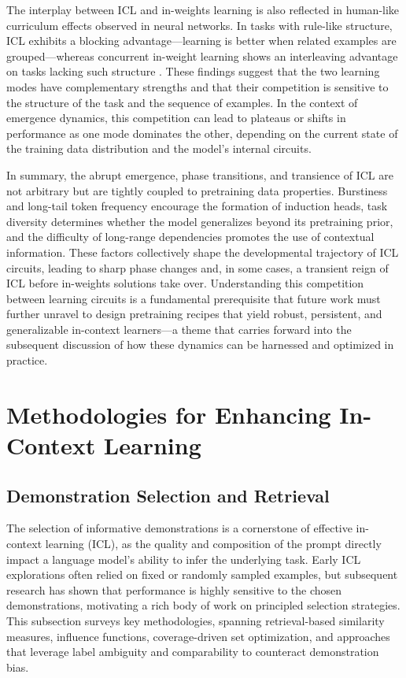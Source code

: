 \documentclass[11pt]{article}
\begin{document}
The interplay between ICL and in-weights learning is also reflected in human-like curriculum effects observed in neural networks. In tasks with rule-like structure, ICL exhibits a blocking advantage---learning is better when related examples are grouped---whereas concurrent in-weight learning shows an interleaving advantage on tasks lacking such structure \cite{ref66}. These findings suggest that the two learning modes have complementary strengths and that their competition is sensitive to the structure of the task and the sequence of examples. In the context of emergence dynamics, this competition can lead to plateaus or shifts in performance as one mode dominates the other, depending on the current state of the training data distribution and the model's internal circuits.

In summary, the abrupt emergence, phase transitions, and transience of ICL are not arbitrary but are tightly coupled to pretraining data properties. Burstiness and long-tail token frequency encourage the formation of induction heads, task diversity determines whether the model generalizes beyond its pretraining prior, and the difficulty of long-range dependencies promotes the use of contextual information. These factors collectively shape the developmental trajectory of ICL circuits, leading to sharp phase changes and, in some cases, a transient reign of ICL before in-weights solutions take over. Understanding this competition between learning circuits is a fundamental prerequisite that future work must further unravel to design pretraining recipes that yield robust, persistent, and generalizable in-context learners---a theme that carries forward into the subsequent discussion of how these dynamics can be harnessed and optimized in practice.

\section{Methodologies for Enhancing In-Context Learning}

\subsection{Demonstration Selection and Retrieval}

The selection of informative demonstrations is a cornerstone of effective in-context learning (ICL), as the quality and composition of the prompt directly impact a language model's ability to infer the underlying task. Early ICL explorations often relied on fixed or randomly sampled examples, but subsequent research has shown that performance is highly sensitive to the chosen demonstrations, motivating a rich body of work on principled selection strategies. This subsection surveys key methodologies, spanning retrieval-based similarity measures, influence functions, coverage-driven set optimization, and approaches that leverage label ambiguity and comparability to counteract demonstration bias.
\end{document}

